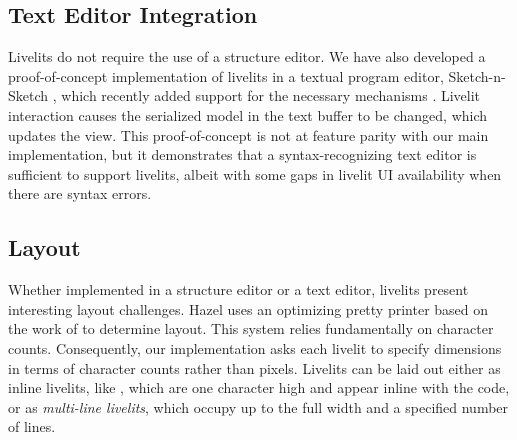 
\subsection{Text Editor Integration}
Livelits do not require the use of a structure editor. 
We have also developed a 
proof-of-concept implementation of livelits in a textual program editor, Sketch-n-Sketch \cite{sns-pldi,sns-uist},
which recently added support for the necessary mechanisms \cite{DBLP:journals/pacmpl/LubinCOC20}.
Livelit interaction causes the serialized model in the text buffer to be changed, which updates the view.
This proof-of-concept is not at feature parity with 
our main implementation, but it demonstrates that a syntax-recognizing text editor \cite{DBLP:journals/tosem/BallanceGV92,DBLP:conf/sde/HorganM84,interactive-visual-notation} 
is sufficient to support livelits, albeit with some gaps in livelit UI availability when 
there are syntax errors.

\subsection{Layout}\label{sec:layout}
Whether implemented in a structure editor or a text editor, livelits present 
interesting layout challenges. 
Hazel uses an optimizing pretty printer based on the work of \citet{DBLP:journals/pacmpl/Bernardy17} to determine layout. This system relies 
fundamentally on character counts. Consequently, our implementation asks each 
livelit to specify dimensions in terms of character counts rather than pixels.
Livelits can be laid out either as inline livelits, like ,
which are one character high and appear inline with the code,
or as \emph{multi-line livelits}, which occupy up to the full width 
and a specified number of lines. %


